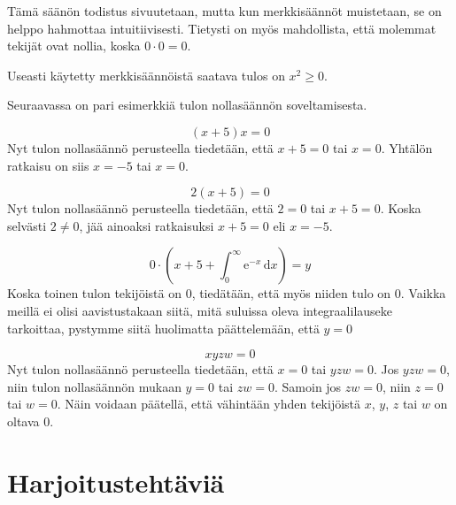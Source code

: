 Tämä säänön todistus sivuutetaan, mutta kun merkkisäännöt muistetaan, se
on helppo hahmottaa intuitiivisesti. Tietysti on myös mahdollista, että molemmat
tekijät ovat nollia, koska $0\cdot 0=0$.

Useasti käytetty merkkisäännöistä saatava tulos on $x^2 \geq 0$.

Seuraavassa on pari esimerkkiä tulon nollasäännön soveltamisesta.

\begin{esimerkki}
	\[(x+5)x=0\]
	Nyt tulon nollasäännö perusteella tiedetään, että $x+5=0$ tai $x=0$.
	Yhtälön ratkaisu on siis $x=-5$ tai $x=0$.
\end{esimerkki}

\begin{esimerkki}
	\[2(x+5)=0\]
	Nyt tulon nollasäännö perusteella tiedetään, että $2=0$ tai $x+5=0$.
	Koska selvästi $2\neq 0$, jää ainoaksi ratkaisuksi $x+5=0$ eli $x=-5$.
\end{esimerkki}

\begin{esimerkki}
	\[0\cdot(x+5+\int_0^\infty \mathrm{e}^{-x}\,\mathrm{d}x)=y\]
	Koska toinen tulon tekijöistä on $0$, tiedätään, että myös niiden tulo on $0$.
	Vaikka meillä ei olisi aavistustakaan siitä, mitä suluissa oleva integraalilauseke tarkoittaa,
	pystymme siitä huolimatta päättelemään, että $y=0$
\end{esimerkki}

\begin{esimerkki}
	\[xyzw=0\]
	Nyt tulon nollasäännö perusteella tiedetään, että $x=0$ tai $yzw=0$. Jos $yzw=0$, niin tulon nollasäännön mukaan $y=0$ tai $zw=0$. Samoin jos $zw=0$, niin $z=0$ tai $w=0$. Näin voidaan päätellä, että vähintään yhden tekijöistä $x$, $y$, $z$ tai $w$ on oltava $0$.
\end{esimerkki}

\section{Harjoitustehtäviä}

